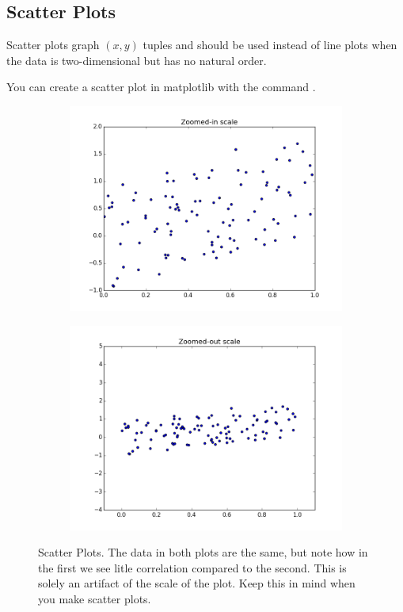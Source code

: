 \subsection*{Scatter Plots} 

Scatter plots graph $(x,y)$ tuples and should be used instead of line plots when the data is two-dimensional but has no natural order. 
 
You can create a scatter plot in matplotlib with the command .

\begin{figure}[h]
\centering
\begin{subfigure}{.45\textwidth}
\centering
\includegraphics[width=\textwidth]{scale_scatter_zoomed_in.png}
\end{subfigure}
\begin{subfigure}{.45\textwidth}
\centering
\includegraphics[width=\textwidth]{scale_scatter_zoomed_out.png}
\end{subfigure}
\caption{Scatter Plots.  The data in both plots are the same, but note how in the first we see litle correlation compared to the second.  This is solely an artifact of the scale of the plot.  Keep this in mind when you make scatter plots.}
\label{fig:scatter_correlation}
\end{figure}


